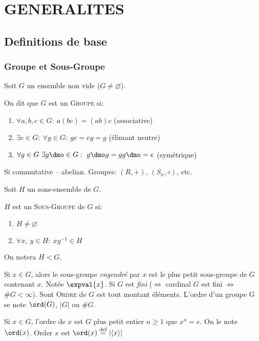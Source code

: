 \chapter{GENERALITES} %
\label{cha:generalites}

\section{Definitions de base}
\subsection{Groupe et Sous-Groupe} %
\label{sub:groupe_et_sous_groupe}

Soit $G$ un ensemble non vide ($G\neq\varnothing$).
\begin{definition}
	On dit que $G$ est un \textsc{Groupe} si:
	\begin{enumerate}
		\item $\forall a,b,c\in G:\ a(bc)=(ab)c$ (associative)
		\item $\exists e\in G:\ \forall g\in G:\ ge=eg=g$ (élimant neutre)
		\item $\forall g\in G\ \exists g\dmo \in G:\ g\dmo g=gg\dmo=e$ (symétrique)
	\end{enumerate}
\end{definition}

Si commutative -- abelian. Groupes: $(R, +)$, $(S_n, \circ)$, etc.

Soit $H$ un sons-ensemble de $G$.
\begin{definition}
	$H$ est un \textsc{Sous-Groupe} de $G$ si:
	\begin{enumerate}
		\item $H\neq\varnothing$
		\item $\forall x,\ y \in H:\ xy^{-1}\in H$
	\end{enumerate}
	On notera $H < G$.
\end{definition}

Si $x\in G$, alors le sous-groupe \emph{engendré} par $x$ est le plus petit sous-groupe de $G$ contenant $x$. Notée $\expval{x}$. Si $G$ est \emph{fini} ($\Leftrightarrow$ cardinal $G$ est fini $\Leftrightarrow$ $\#G<\infty$). Sont \textsc{Ordre} de $G$ est tout montant éléments. L'ordre d'un groupe G se note $\ord(G)$, $|G|$ ou $\#G$.

Si  $x\in G$, l'ordre de $x$ est $G$ plus petit entier $n\geq 1$ que $x^n = e$. On le note $\ord(x)$. Order $x$ est $\ord(x)\overset{\text{def}}{=}|\langle x\rangle|$

